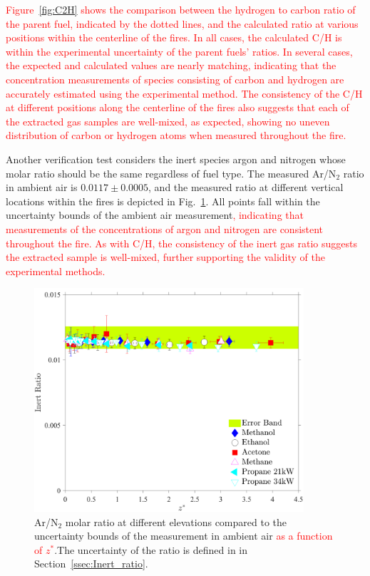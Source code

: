 \documentclass[12pt]{article}
\begin{document}
\textcolor{red}{Figure~\ref{fig:C2H} shows the comparison between the hydrogen to carbon ratio of the parent fuel, indicated by the dotted lines, and the calculated ratio at various positions within the centerline of the fires. In all cases, the calculated C/H is within the experimental uncertainty of the parent fuels' ratios. In several cases, the expected and calculated values are nearly matching, indicating that the concentration measurements of species consisting of carbon and hydrogen are accurately estimated using the experimental method. The consistency of the {C}/{H} at different positions along the centerline of the fires also suggests that each of the extracted gas samples are well-mixed, as expected, showing no uneven distribution of carbon or hydrogen atoms when measured throughout the fire.}

Another verification test considers the inert species argon and nitrogen whose molar ratio should be the same regardless of fuel type. The measured Ar/N$_2$ ratio in ambient air is $0.0117\pm0.0005$, and the measured ratio at different vertical locations within the fires is depicted in Fig.~\ref{fig:IR}. All points fall within the uncertainty bounds of the ambient air measurement\textcolor{red}{, indicating that measurements of the concentrations of argon and nitrogen are consistent throughout the fire. As with {C}/{H}, the consistency of the inert gas ratio suggests the extracted sample is well-mixed, further supporting the validity of the experimental methods.}

\begin{figure}[h!]
	\centering
\includegraphics[width=10.0cm, keepaspectratio]{Inert_ratio_Comparison.pdf}
	\caption[Ar/N$_2$ ratio within the fire envelop compared to ambient air]{Ar/N$_2$ molar ratio at different elevations compared to the uncertainty bounds of the measurement in ambient air \textcolor{red}{ as a function of $z^*$}.The uncertainty of the ratio is defined in in Section~\ref{ssec:Inert_ratio}.}
	\label{fig:IR}
\end{figure}
\clearpage
\end{document}
